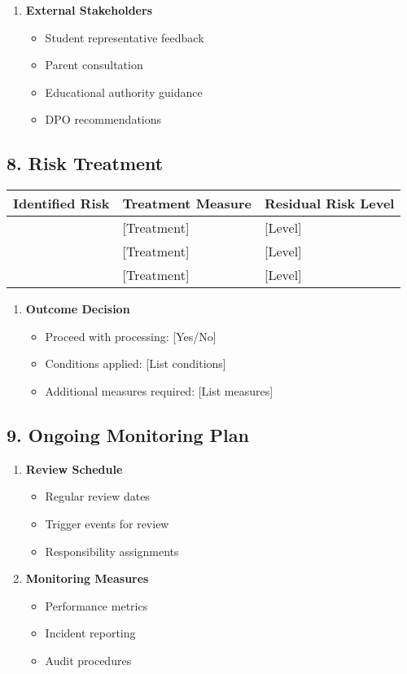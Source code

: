 \documentclass[14pt,a4paper]{article}
\begin{document}
\begin{multicols}{2}
\begin{enumerate}
    \item \textbf{External Stakeholders}
    \begin{itemize}
        \item Student representative feedback
        \item Parent consultation
        \item Educational authority guidance
        \item DPO recommendations
    \end{itemize}
\end{enumerate}
\end{multicols}

\subsection*{8. Risk Treatment}
\begin{longtable}{|p{4cm}|p{4cm}|p{4cm}|}
    \hline
    \textbf{Identified Risk} & \textbf{Treatment Measure} & \textbf{Residual Risk Level} \\
    \hline
    [Risk 1] & [Treatment] & [Level] \\
    \hline
    [Risk 2] & [Treatment] & [Level] \\
    \hline
    [Risk 3] & [Treatment] & [Level] \\
    \hline
\end{longtable}


\begin{enumerate}
    \item \textbf{Outcome Decision}
    \begin{itemize}
        \item Proceed with processing: [Yes/No]
        \item Conditions applied: [List conditions]
        \item Additional measures required: [List measures]
    \end{itemize}
\end{enumerate}

\subsection*{9. Ongoing Monitoring Plan}
\begin{enumerate}
    \item \textbf{Review Schedule}
    \begin{itemize}
        \item Regular review dates
        \item Trigger events for review
        \item Responsibility assignments
    \end{itemize}

    \item \textbf{Monitoring Measures}
    \begin{itemize}
        \item Performance metrics
        \item Incident reporting
        \item Audit procedures
    \end{itemize}
\end{enumerate}
\end{document}
